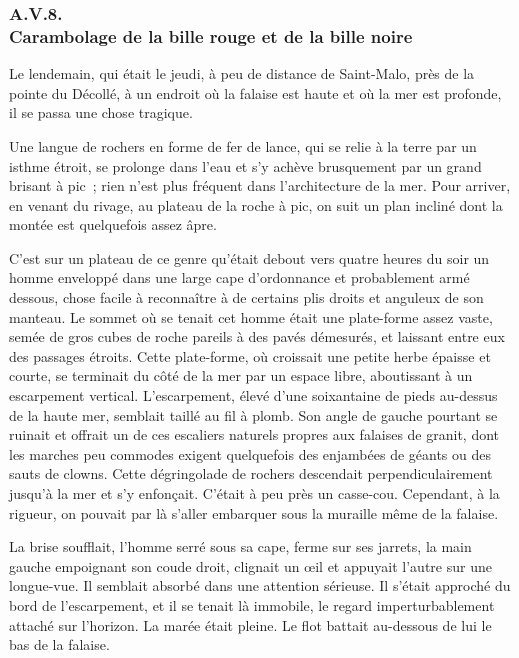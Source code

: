 \documentclass[french,twoside]{book} %
\begin{document}
 \subsubsection[{A.V.8. Carambolage de la bille rouge et de la bille noire}]{A.V.8. \\
Carambolage de la bille rouge et de la bille noire}
\noindent Le lendemain, qui était le jeudi, à peu de distance de Saint-Malo, près de la pointe du Décollé, à un endroit où la falaise est haute et où la mer est profonde, il se passa une chose tragique.\par
Une langue de rochers en forme de fer de lance, qui se relie à la terre par un isthme étroit, se prolonge dans l’eau et s’y achève brusquement par un grand brisant à pic ; rien n’est plus fréquent dans l’architecture de la mer. Pour arriver, en venant du rivage, au plateau de la roche à pic, on suit un plan incliné dont la montée est quelquefois assez âpre.\par
C’est sur un plateau de ce genre qu’était debout vers quatre heures du soir un homme enveloppé dans une large cape d’ordonnance et probablement armé dessous, chose facile à reconnaître à de certains plis droits et anguleux de son manteau. Le sommet où se tenait cet homme était une plate-forme assez vaste,  semée de gros cubes de roche pareils à des pavés démesurés, et laissant entre eux des passages étroits. Cette plate-forme, où croissait une petite herbe épaisse et courte, se terminait du côté de la mer par un espace libre, aboutissant à un escarpement vertical. L’escarpement, élevé d’une soixantaine de pieds au-dessus de la haute mer, semblait taillé au fil à plomb. Son angle de gauche pourtant se ruinait et offrait un de ces escaliers naturels propres aux falaises de granit, dont les marches peu commodes exigent quelquefois des enjambées de géants ou des sauts de clowns. Cette dégringolade de rochers descendait perpendiculairement jusqu’à la mer et s’y enfonçait. C’était à peu près un casse-cou. Cependant, à la rigueur, on pouvait par là s’aller embarquer sous la muraille même de la falaise.\par
La brise soufflait, l’homme serré sous sa cape, ferme sur ses jarrets, la main gauche empoignant son coude droit, clignait un œil et appuyait l’autre sur une longue-vue. Il semblait absorbé dans une attention sérieuse. Il s’était approché du bord de l’escarpement, et il se tenait là immobile, le regard imperturbablement attaché sur l’horizon. La marée était pleine. Le flot battait au-dessous de lui le bas de la falaise.\par
\end{document}
